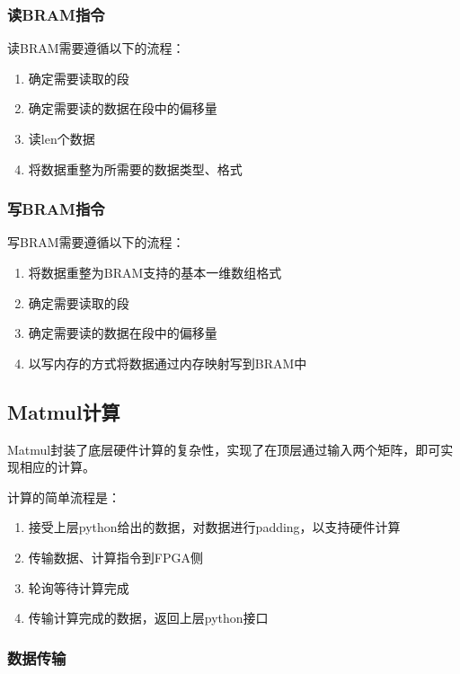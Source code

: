 \documentclass[12pt,a4paper]{article}
\begin{document}
\subsubsection{读BRAM指令}

读BRAM需要遵循以下的流程：

\begin{enumerate}
\def\labelenumi{\arabic{enumi}.}
\item
  确定需要读取的段
\item
  确定需要读的数据在段中的偏移量
\item
  读len个数据
\item
  将数据重整为所需要的数据类型、格式
\end{enumerate}

\subsubsection{写BRAM指令}

写BRAM需要遵循以下的流程：

\begin{enumerate}
\def\labelenumi{\arabic{enumi}.}
\item
  将数据重整为BRAM支持的基本一维数组格式
\item
  确定需要读取的段
\item
  确定需要读的数据在段中的偏移量
\item
  以写内存的方式将数据通过内存映射写到BRAM中
\end{enumerate}

\subsection{Matmul计算}

Matmul封装了底层硬件计算的复杂性，实现了在顶层通过输入两个矩阵，即可实现相应的计算。

计算的简单流程是：

\begin{enumerate}
\def\labelenumi{\arabic{enumi}.}
\item
  接受上层python给出的数据，对数据进行padding，以支持硬件计算
\item
  传输数据、计算指令到FPGA侧
\item
  轮询等待计算完成
\item
  传输计算完成的数据，返回上层python接口
\end{enumerate}

\subsubsection{数据传输}
\end{document}
